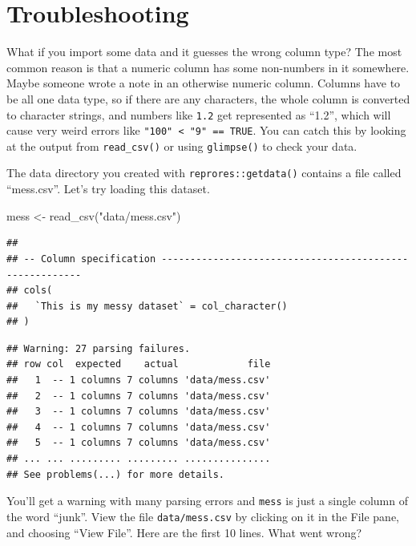\documentclass[
  oneside]{book}
\newenvironment{Shaded}{\begin{snugshade}}{\end{snugshade}}
\newcommand{\FunctionTok}[1]{\textcolor[rgb]{0.00,0.00,0.00}{#1}}
\newcommand{\NormalTok}[1]{#1}
\newcommand{\OtherTok}[1]{\textcolor[rgb]{0.56,0.35,0.01}{#1}}
\newcommand{\StringTok}[1]{\textcolor[rgb]{0.31,0.60,0.02}{#1}}
\begin{document}
\hypertarget{troubleshooting}{%
\section{Troubleshooting}\label{troubleshooting}}

What if you import some data and it guesses the wrong column type? The most common reason is that a numeric column has some non-numbers in it somewhere. Maybe someone wrote a note in an otherwise numeric column. Columns have to be all one data type, so if there are any characters, the whole column is converted to character strings, and numbers like \texttt{1.2} get represented as ``1.2'', which will cause very weird errors like \texttt{"100"\ \textless{}\ "9"\ ==\ TRUE}. You can catch this by looking at the output from \texttt{read\_csv()} or using \texttt{glimpse()} to check your data.

The data directory you created with \texttt{reprores::getdata()} contains a file called ``mess.csv''. Let's try loading this dataset.

\begin{Shaded}
\begin{Highlighting}[]
\NormalTok{mess }\OtherTok{\textless{}{-}} \FunctionTok{read\_csv}\NormalTok{(}\StringTok{"data/mess.csv"}\NormalTok{)}
\end{Highlighting}
\end{Shaded}

\begin{verbatim}
## 
## -- Column specification --------------------------------------------------------
## cols(
##   `This is my messy dataset` = col_character()
## )
\end{verbatim}

\begin{verbatim}
## Warning: 27 parsing failures.
## row col  expected    actual            file
##   1  -- 1 columns 7 columns 'data/mess.csv'
##   2  -- 1 columns 7 columns 'data/mess.csv'
##   3  -- 1 columns 7 columns 'data/mess.csv'
##   4  -- 1 columns 7 columns 'data/mess.csv'
##   5  -- 1 columns 7 columns 'data/mess.csv'
## ... ... ......... ......... ...............
## See problems(...) for more details.
\end{verbatim}

You'll get a warning with many parsing errors and \texttt{mess} is just a single column of the word ``junk''. View the file \texttt{data/mess.csv} by clicking on it in the File pane, and choosing ``View File''. Here are the first 10 lines. What went wrong?
\end{document}
